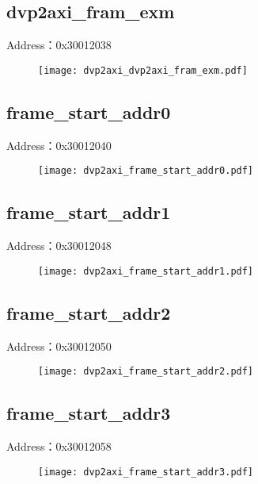 \subsection{dvp2axi\_fram\_exm}
\label{dvp2axi-dvp2axi-fram-exm}
Address：0x30012038
 \begin{figure}[H]
\texttt{[image: dvp2axi\_dvp2axi\_fram\_exm.pdf]}
\end{figure}

\subsection{frame\_start\_addr0}
\label{dvp2axi-frame-start-addr0}
Address：0x30012040
 \begin{figure}[H]
\texttt{[image: dvp2axi\_frame\_start\_addr0.pdf]}
\end{figure}

\subsection{frame\_start\_addr1}
\label{dvp2axi-frame-start-addr1}
Address：0x30012048
 \begin{figure}[H]
\texttt{[image: dvp2axi\_frame\_start\_addr1.pdf]}
\end{figure}

\subsection{frame\_start\_addr2}
\label{dvp2axi-frame-start-addr2}
Address：0x30012050
 \begin{figure}[H]
\texttt{[image: dvp2axi\_frame\_start\_addr2.pdf]}
\end{figure}

\subsection{frame\_start\_addr3}
\label{dvp2axi-frame-start-addr3}
Address：0x30012058
 \begin{figure}[H]
\texttt{[image: dvp2axi\_frame\_start\_addr3.pdf]}
\end{figure}

